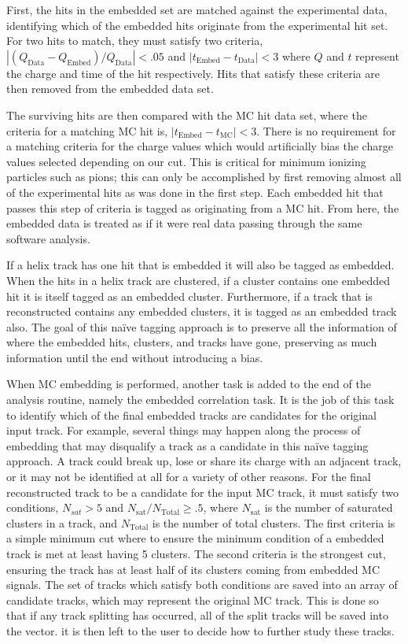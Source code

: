 First, the hits in the embedded set are matched against the experimental data, identifying which of the embedded hits originate from the experimental hit set. For two hits to match, they must satisfy two criteria, $\left|(Q_{\mathrm{Data}} - Q_{\mathrm{Embed} })/Q_{\mathrm{Data}}\right| < .05$ and $\left|t_{\mathrm{Embed} } - t_{\mathrm{Data} }\right| < 3$ where $Q$ and $t$ represent the charge and time of the hit respectively. Hits that satisfy these criteria are then removed from the embedded data set.

The surviving hits are then compared with the MC hit data set, where the criteria for a matching MC hit is, $\left|t_{\mathrm{Embed} } - t_{\mathrm{MC} }\right| < 3$.  There is no requirement for a matching criteria for the charge values which would artificially bias the charge values selected depending on our cut. This is critical for minimum ionizing particles such as pions; this can only be accomplished by first removing almost all of the experimental hits as was done in the first step. Each embedded hit that passes this step of criteria is tagged as originating from a MC hit. From here, the embedded data is treated as if it were real data passing through the same software analysis. 

 If a helix track has one hit that is embedded it will also be tagged as embedded. When the hits in a helix track are clustered, if a cluster contains one embedded hit it is itself tagged as an embedded cluster. Furthermore, if a track that is reconstructed contains any embedded clusters, it is tagged as an embedded track also. The goal of this na\"ive tagging approach is to preserve all the information of where the embedded hits, clusters, and tracks have gone, preserving as much information until the end without introducing a bias.
 
  When MC embedding is performed, another task is added to the end of the analysis routine, namely the embedded correlation task. It is the job of this task to identify which of the final embedded tracks are candidates for the original input track. For example, several things may happen along the process of embedding that may disqualify a track as a candidate in this na\"ive tagging approach. A track could break up, lose or share its charge with an adjacent track, or it may not be identified at all for a variety of other reasons. For the final reconstructed track to be a candidate for the input MC track, it must satisfy two conditions, $N_{sat} > 5$ and $N_{\mathrm{sat}}/N_{\mathrm{Total}} \geq .5$, where $N_{\mathrm{sat}}$ is the number of saturated clusters in a track, and $N_{\mathrm{Total}}$ is the number of total clusters. The first criteria is a simple minimum cut where to ensure the minimum condition of a embedded track is met at least having 5 clusters. The second criteria is the strongest cut, ensuring the track has at least half of its clusters coming from embedded MC signals. The set of tracks which satisfy both conditions are saved into an array of candidate tracks, which may represent the original MC track. This is done so that if any track splitting has occurred, all of the split tracks will be saved into the vector. it is then left to the user to decide how to further study these tracks. 

